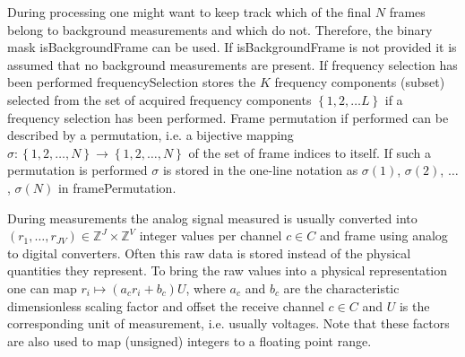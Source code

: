 \documentclass[landscape,a4paper]{article} %
\newcommand{\inlvar}[1]{{\ttfamily#1}}
\begin{document}
\begin{multicols}{2}
During processing one might want to keep track which of the final $N$ frames belong to background measurements and which do not. Therefore, the binary mask \inlvar{isBackgroundFrame} can be used. If \inlvar{isBackgroundFrame} is not provided it is assumed that no background measurements are present. If frequency selection has been performed \inlvar{frequencySelection} stores the $K$ frequency components (subset) selected from the set of acquired frequency components $\left\{ 1,2,\dots L \right\}$ if a frequency selection has been performed. Frame permutation if performed can be described by a permutation, i.e. a bijective mapping $\sigma : \left\{ 1,2,\dots,N \right\} \rightarrow \left\{ 1,2,\dots,N \right\}$ of the set of frame indices to itself. If such a permutation is performed $\sigma$ is stored in the one-line notation as $\sigma(1)$, $\sigma(2)$, $\dots$, $\sigma(N)$ in \inlvar{framePermutation}.

During measurements the analog signal measured is usually converted into $(r_1,\dots,r_{JV}) \in \mathbb Z^J \times \mathbb Z^V$ integer values per channel $c \in C$ and frame using analog to digital converters. Often this raw data is stored instead of the physical quantities they represent. To bring the raw values into a physical representation one can map $r_i \mapsto (a_c r_i + b_c) U$, where $a_c$ and $b_c$ are the characteristic dimensionless scaling factor and offset the receive channel $c \in C$ and $U$ is the corresponding unit of measurement, i.e. usually voltages. Note that these factors are also used to map (unsigned) integers to a floating point range.
\end{multicols}
\end{document}
